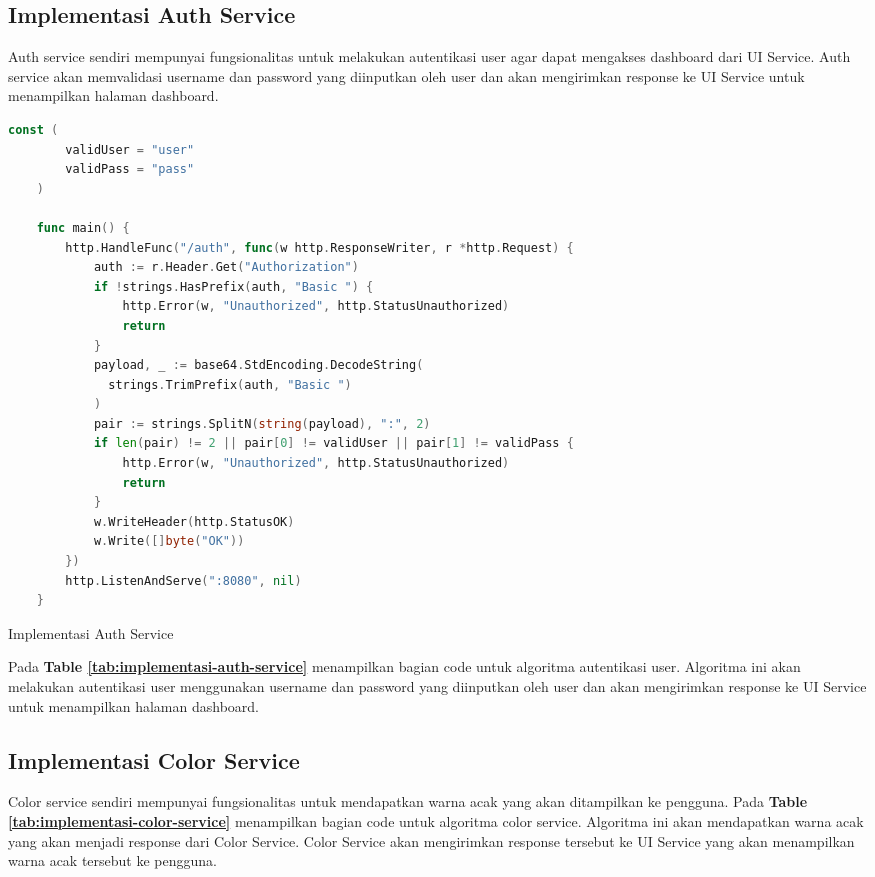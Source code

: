 \subsection{Implementasi Auth Service}
Auth service sendiri mempunyai fungsionalitas untuk melakukan autentikasi user
agar dapat mengakses dashboard dari UI Service. Auth service akan memvalidasi
username dan password yang diinputkan oleh user dan akan mengirimkan response
ke UI Service untuk menampilkan halaman dashboard.

\begin{table}[H]
  \centering
  \begin{minipage}{0.95\linewidth}
    \begin{lstlisting}[language=go, basicstyle=\footnotesize\ttfamily]
    const (
        validUser = "user"
        validPass = "pass"
    )
    
    func main() {
        http.HandleFunc("/auth", func(w http.ResponseWriter, r *http.Request) {
            auth := r.Header.Get("Authorization")
            if !strings.HasPrefix(auth, "Basic ") {
                http.Error(w, "Unauthorized", http.StatusUnauthorized)
                return
            }
            payload, _ := base64.StdEncoding.DecodeString(
              strings.TrimPrefix(auth, "Basic ")
            )
            pair := strings.SplitN(string(payload), ":", 2)
            if len(pair) != 2 || pair[0] != validUser || pair[1] != validPass {
                http.Error(w, "Unauthorized", http.StatusUnauthorized)
                return
            }
            w.WriteHeader(http.StatusOK)
            w.Write([]byte("OK"))
        })
        http.ListenAndServe(":8080", nil)
    }
    \end{lstlisting}
  \end{minipage}
  \caption{Implementasi Auth Service}
  \label{tab:implementasi-auth-service}
\end{table}
Pada \textbf{Table \ref{tab:implementasi-auth-service}} menampilkan bagian
code untuk algoritma autentikasi user. Algoritma ini akan melakukan autentikasi
user menggunakan username dan password yang diinputkan oleh user dan akan
mengirimkan response ke UI Service untuk menampilkan halaman dashboard.

\subsection{Implementasi Color Service}
Color service sendiri mempunyai fungsionalitas untuk mendapatkan warna acak
yang akan ditampilkan ke pengguna. Pada \textbf{Table
  \ref{tab:implementasi-color-service}} menampilkan bagian code untuk algoritma
color service. Algoritma ini akan mendapatkan warna acak yang akan menjadi
response dari Color Service. Color Service akan mengirimkan response tersebut
ke UI Service yang akan menampilkan warna acak tersebut ke pengguna.

